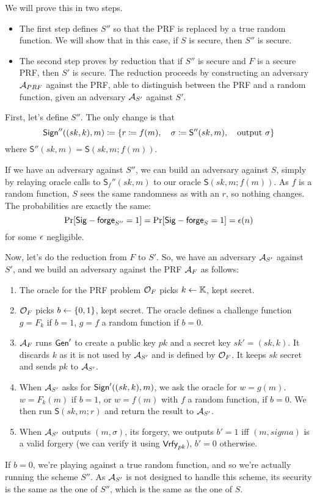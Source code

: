\begin{solution}
	We will prove this in two steps.
	\begin{itemize}
		\item The first step defines $S''$ so that the PRF is replaced by a true random function.
		We will show that in this case, if $S$ is secure, then $S''$ is secure.
		\item The second step proves by reduction that if $S''$ is secure and $F$ is a secure PRF, then $S'$ is secure.
		The reduction proceeds by constructing an adversary $\mathcal{A}_{PRF}$ against the PRF, able to distinguish between the PRF and a random function, given an adversary $\mathcal{A}_{S'}$ against $S'$.
	\end{itemize}

	First, let's define $S''$.
	The only change is that
	\[ \operatorname{\mathsf{Sign}}''((sk, k), m) \coloneqq \{ r \coloneqq f(m), \quad \sigma \coloneqq \mathsf{S}''(sk, m), \quad \text{output } \sigma \} \]
	where $\mathsf{S}''(sk, m) = \mathsf{S}(sk, m; f(m))$.

	If we have an adversary against $S''$, we can build an adversary against $S$, simply by relaying oracle calls to $\mathsf{S}_f''(sk, m)$ to our oracle $\mathsf{S}(sk, m; f(m))$.
	As $f$ is a random function, $S$ sees the same randomness as with an $r$, so nothing changes.
	The probabilities are exactly the same:
	\[ \Pr[\mathsf{Sig-forge}_{S''}=1] = \Pr[\mathsf{Sig-forge}_{S}=1] = \epsilon(n) \]
	for some $\epsilon$ negligible.

	Now, let's do the reduction from $F$ to $S'$.
	So, we have an adversary $\mathcal{A}_{S'}$ against $S'$, and we build an adversary against the PRF $\mathcal{A}_F$ as follows:
	\begin{enumerate}
		\item The oracle for the PRF problem $\mathcal{O}_F$ picks $k \leftarrow \mathbb{K}$, kept secret.
		\item $\mathcal{O}_F$ picks $b \leftarrow \{0, 1\}$, kept secret.
		The oracle defines a challenge function $g=F_k$ if $b=1$, $g=f$ a random function if $b=0$.
		\item $\mathcal{A}_F$ runs $\operatorname{\mathsf{Gen}}'$ to create a public key $pk$ and a secret key $sk'=(sk, k)$.
		It discards $k$ as it is not used by $\mathcal{A}_{S'}$ and is defined by $\mathcal{O}_F$.
		It keeps $sk$ secret and sends $pk$ to $\mathcal{A}_{S'}$.
		\item When $\mathcal{A}_{S'}$ asks for $\operatorname{\mathsf{Sign}}'((sk, k), m)$, we ask the oracle for $w=g(m)$.
		$w=F_k(m)$ if $b=1$, or $w=f(m)$ with $f$ a random function, if $b=0$.
		We then run $\mathsf{S}(sk, m; r)$ and return the result to $\mathcal{A}_{S'}$.
		\item When $\mathcal{A}_{S'}$ outputs $(m, \sigma)$, its forgery, we outputs $b'=1$ iff $(m, sigma)$ is a valid forgery (we can verify it using $\operatorname{\mathsf{Vrfy}}_{pk}$), $b'=0$ otherwise.
	\end{enumerate}
	If $b=0$, we're playing against a true random function, and so we're actually running the scheme $S''$.
	As $\mathcal{A}_{S'}$ is not designed to handle this scheme, its security is the same as the one of $S''$, which is the same as the one of $S$.


\end{solution}
